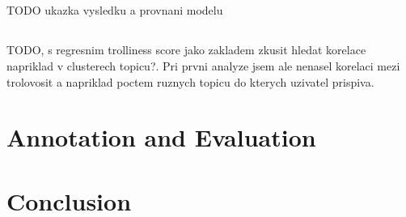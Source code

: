 \documentclass[twoside]{ctuthesis}
\theoremstyle{plain}
\theoremstyle{definition}
\theoremstyle{note}
\begin{document}


\section{}
TODO ukazka vysledku a provnani modelu

\section{}
TODO, s regresnim trolliness score jako zakladem zkusit hledat korelace napriklad v clusterech topicu?. Pri prvni analyze jsem ale nenasel korelaci mezi trolovosit a napriklad poctem ruznych topicu do kterych uzivatel prispiva. 

\chapter{Annotation and Evaluation}




\chapter{Conclusion}

\appendix

\printindex

 

\end{document}
